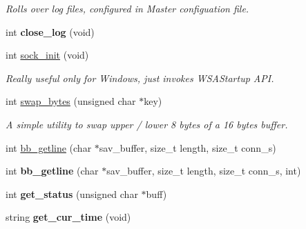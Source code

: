 \begin{DoxyCompactItemize}
\begin{DoxyCompactList}\small\item\em Rolls over log files, configured in Master configuation file. \end{DoxyCompactList}\item 
\hypertarget{classgeneric__server_a3e154dfbe279b826e32105b789f70d23}{int {\bfseries close\-\_\-log} (void)}\label{classgeneric__server_a3e154dfbe279b826e32105b789f70d23}

\item 
\hypertarget{classgeneric__server_a863674d44025a2039da2ca2efa5cfc38}{int \hyperlink{classgeneric__server_a863674d44025a2039da2ca2efa5cfc38}{sock\-\_\-init} (void)}\label{classgeneric__server_a863674d44025a2039da2ca2efa5cfc38}

\begin{DoxyCompactList}\small\item\em Really useful only for Windows, just invokes W\-S\-A\-Startup A\-P\-I. \end{DoxyCompactList}\item 
\hypertarget{classgeneric__server_a03f89c94d97b41b7eafc12262e740eb0}{int \hyperlink{classgeneric__server_a03f89c94d97b41b7eafc12262e740eb0}{swap\-\_\-bytes} (unsigned char $\ast$key)}\label{classgeneric__server_a03f89c94d97b41b7eafc12262e740eb0}

\begin{DoxyCompactList}\small\item\em A simple utility to swap upper / lower 8 bytes of a 16 bytes buffer. \end{DoxyCompactList}\item 
int \hyperlink{classgeneric__server_ae3654bb1871f8ac406824ba39b8c6d6e}{bb\-\_\-getline} (char $\ast$sav\-\_\-buffer, size\-\_\-t length, size\-\_\-t conn\-\_\-s)
\item 
\hypertarget{classgeneric__server_af31fe6b46ca69c627ba8e70ea2e52d9b}{int {\bfseries bb\-\_\-getline} (char $\ast$sav\-\_\-buffer, size\-\_\-t length, size\-\_\-t conn\-\_\-s, int)}\label{classgeneric__server_af31fe6b46ca69c627ba8e70ea2e52d9b}

\item 
\hypertarget{classgeneric__server_a211d0231b92304991390ea50b369289b}{int {\bfseries get\-\_\-status} (unsigned char $\ast$buff)}\label{classgeneric__server_a211d0231b92304991390ea50b369289b}

\item 
\hypertarget{classgeneric__server_ad6f0da2aa51af9236238159fb1444927}{string {\bfseries get\-\_\-cur\-\_\-time} (void)}\label{classgeneric__server_ad6f0da2aa51af9236238159fb1444927}


\end{DoxyCompactItemize}
